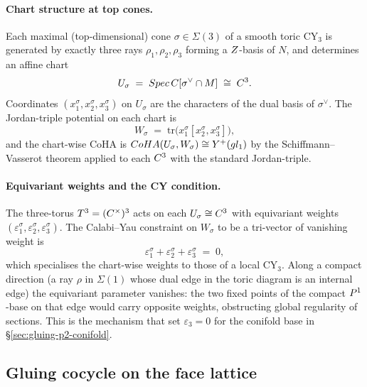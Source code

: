 \paragraph{Chart structure at top cones.}
Each maximal (top-dimensional) cone $\sigma \in \Sigma(3)$ of a smooth
toric CY$_3$ is generated by exactly three rays
$\rho_1, \rho_2, \rho_3$ forming a $Z$-basis of $N$, and determines an
affine chart
\[
  U_\sigma \;=\; Spec\,C[\sigma^\vee \cap M] \;\cong\; C^3.
\]
Coordinates $(x_1^\sigma, x_2^\sigma, x_3^\sigma)$ on $U_\sigma$ are the
characters of the dual basis of $\sigma^\vee$.  The Jordan-triple
potential on each chart is
\[
  W_\sigma \;=\; \mathrm{tr}\bigl(x_1^\sigma [x_2^\sigma, x_3^\sigma]\bigr),
\]
and the chart-wise CoHA is $CoHA(U_\sigma, W_\sigma) \cong
Y^+(gl_1)$ by the Schiffmann--Vasserot theorem applied to each
$C^3$ with the standard Jordan-triple.

\paragraph{Equivariant weights and the CY condition.}
The three-torus $T^3 = (C^\times)^3$ acts on each $U_\sigma \cong C^3$
with equivariant weights $(\varepsilon_1^\sigma, \varepsilon_2^\sigma,
\varepsilon_3^\sigma)$.  The Calabi--Yau constraint on $W_\sigma$ to be a
tri-vector of vanishing weight is
\[
  \varepsilon_1^\sigma + \varepsilon_2^\sigma + \varepsilon_3^\sigma \;=\; 0,
\]
which specialises the chart-wise weights to those of a local CY$_3$.  Along
a compact direction (a ray $\rho$ in $\Sigma(1)$ whose dual edge in the
toric diagram is an internal edge) the equivariant parameter vanishes:
the two fixed points of the compact $P^1$-base on that edge would carry
opposite weights, obstructing global regularity of sections.  This is the
mechanism that set $\varepsilon_3 = 0$ for the conifold base in
\S\ref{sec:gluing-p2-conifold}.

\subsection{Gluing cocycle on the face lattice}

